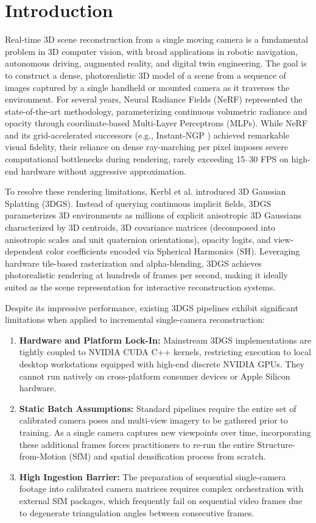 \documentclass[conference]{IEEEtran}
\begin{document}
\section{Introduction}
Real-time 3D scene reconstruction from a single moving camera is a fundamental problem in 3D computer vision, with broad applications in robotic navigation, autonomous driving, augmented reality, and digital twin engineering. The goal is to construct a dense, photorealistic 3D model of a scene from a sequence of images captured by a single handheld or mounted camera as it traverses the environment. For several years, Neural Radiance Fields (NeRF) \cite{mildenhall2020nerf} represented the state-of-the-art methodology, parameterizing continuous volumetric radiance and opacity through coordinate-based Multi-Layer Perceptrons (MLPs). While NeRF and its grid-accelerated successors (e.g., Instant-NGP \cite{muller2022instant}) achieved remarkable visual fidelity, their reliance on dense ray-marching per pixel imposes severe computational bottlenecks during rendering, rarely exceeding 15--30 FPS on high-end hardware without aggressive approximation.

To resolve these rendering limitations, Kerbl et al. \cite{kerbl20233d} introduced 3D Gaussian Splatting (3DGS). Instead of querying continuous implicit fields, 3DGS parameterizes 3D environments as millions of explicit anisotropic 3D Gaussians characterized by 3D centroids, 3D covariance matrices (decomposed into anisotropic scales and unit quaternion orientations), opacity logits, and view-dependent color coefficients encoded via Spherical Harmonics (SH). Leveraging hardware tile-based rasterization and alpha-blending, 3DGS achieves photorealistic rendering at hundreds of frames per second, making it ideally suited as the scene representation for interactive reconstruction systems.

Despite its impressive performance, existing 3DGS pipelines exhibit significant limitations when applied to incremental single-camera reconstruction:
\begin{enumerate}
    \item \textbf{Hardware and Platform Lock-In:} Mainstream 3DGS implementations are tightly coupled to NVIDIA CUDA C++ kernels, restricting execution to local desktop workstations equipped with high-end discrete NVIDIA GPUs. They cannot run natively on cross-platform consumer devices or Apple Silicon hardware.
    \item \textbf{Static Batch Assumptions:} Standard pipelines require the entire set of calibrated camera poses and multi-view imagery to be gathered prior to training. As a single camera captures new viewpoints over time, incorporating these additional frames forces practitioners to re-run the entire Structure-from-Motion (SfM) and spatial densification process from scratch.
    \item \textbf{High Ingestion Barrier:} The preparation of sequential single-camera footage into calibrated camera matrices requires complex orchestration with external SfM packages, which frequently fail on sequential video frames due to degenerate triangulation angles between consecutive frames.
\end{enumerate}
\end{document}

